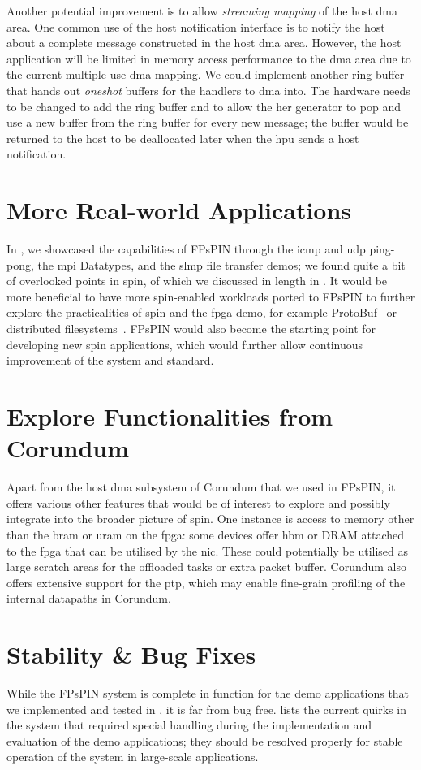Another potential improvement is to allow \emph{streaming mapping} of the host \ac{dma} area.  One common use of the host notification interface is to notify the host about a complete message constructed in the host \ac{dma} area.  However, the host application will be limited in memory access performance to the \ac{dma} area due to the current multiple-use \ac{dma} mapping.  We could implement another ring buffer that hands out \emph{oneshot} buffers for the handlers to \ac{dma} into.  The hardware needs to be changed to add the ring buffer and to allow the \ac{her} generator to pop and use a new buffer from the ring buffer for every new message; the buffer would be returned to the host to be deallocated later when the \ac{hpu} sends a host notification.

\section{More Real-world Applications}

In , we showcased the capabilities of FPsPIN through the \ac{icmp} and \ac{udp} ping-pong, the \ac{mpi} Datatypes, and the \ac{slmp} file transfer demos; we found quite a bit of overlooked points in \ac{spin}, of which we discussed in length in . It would be more beneficial to have more \ac{spin}-enabled workloads ported to FPsPIN to further explore the practicalities of \ac{spin} and the \ac{fpga} demo, for example ProtoBuf~\cite{cao_accelerating_2022} or distributed filesystems~\cite{di_girolamo_building_2022}.  FPsPIN would also become the starting point for developing new \ac{spin} applications, which would further allow continuous improvement of the system and standard.

\section{Explore Functionalities from Corundum}

Apart from the host \ac{dma} subsystem of Corundum that we used in FPsPIN, it offers various other features that would be of interest to explore and possibly integrate into the broader picture of \ac{spin}.  One instance is access to memory other than the \ac{bram} or \ac{uram} on the \ac{fpga}: some devices offer \ac{hbm} or DRAM attached to the \ac{fpga} that can be utilised by the \ac{nic}.  These could potentially be utilised as large scratch areas for the offloaded tasks or extra packet buffer.  Corundum also offers extensive support for the \acf{ptp}, which may enable fine-grain profiling of the internal datapaths in Corundum.

\section{Stability \& Bug Fixes}

While the FPsPIN system is complete in function for the demo applications that we implemented and tested in , it is far from bug free.   lists the current quirks in the system that required special handling during the implementation and evaluation of the demo applications; they should be resolved properly for stable operation of the system in large-scale applications.
